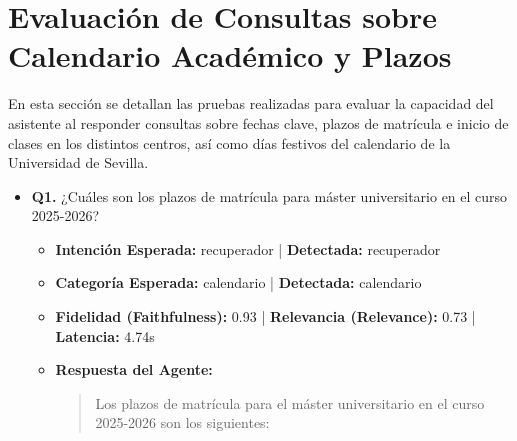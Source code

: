 \documentclass[12pt,a4paper,oneside]{report}
\begin{document}
\newpage
\section{Evaluación de Consultas sobre Calendario Académico y Plazos}
En esta sección se detallan las pruebas realizadas para evaluar la capacidad del asistente al responder consultas sobre fechas clave, plazos de matrícula e inicio de clases en los distintos centros, así como días festivos del calendario de la Universidad de Sevilla.

\begin{itemize}
\item \textbf{Q1.} ¿Cuáles son los plazos de matrícula para máster universitario en el curso 2025-2026? \\
        \begin{itemize}
          \item \textbf{Intención Esperada:} recuperador | \textbf{Detectada:} recuperador
          \item \textbf{Categoría Esperada:} calendario | \textbf{Detectada:} calendario
          \item \textbf{Fidelidad (Faithfulness):} 0.93 | \textbf{Relevancia (Relevance):} 0.73 | \textbf{Latencia:} 4.74s
          \item \textbf{{Respuesta del Agente:}} \\
                \begin{quote}
Los plazos de matrícula para el máster universitario en el curso 2025-2026 son los siguientes:


\end{quote}
\end{itemize}
\end{itemize}
\end{document}
